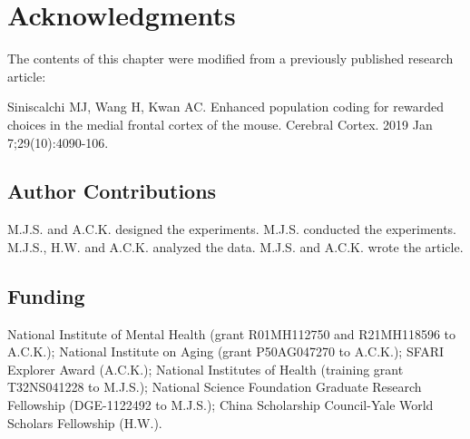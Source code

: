 
\section{Acknowledgments}
The contents of this chapter were modified from a previously published research article: 

Siniscalchi MJ, Wang H, Kwan AC. Enhanced population coding for rewarded choices in the medial frontal cortex of the mouse. Cerebral Cortex. 2019 Jan 7;29(10):4090-106.

\subsection*{Author Contributions}
M.J.S. and A.C.K. designed the experiments. M.J.S. conducted the experiments. M.J.S., H.W. and A.C.K. analyzed the data. M.J.S. and A.C.K. wrote the article.

\subsection*{Funding}
National Institute of Mental Health (grant R01MH112750 and R21MH118596 to A.C.K.); National Institute on Aging (grant P50AG047270 to A.C.K.); SFARI Explorer Award (A.C.K.); National Institutes of Health (training grant T32NS041228 to M.J.S.); National Science Foundation Graduate Research Fellowship (DGE-1122492 to M.J.S.); China Scholarship Council-Yale World Scholars Fellowship (H.W.).